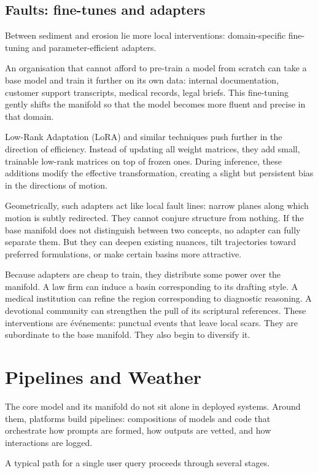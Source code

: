 \documentclass[12pt,a4paper]{article}
\begin{document}
\subsection{Faults: fine-tunes and adapters}

Between sediment and erosion lie more local interventions: domain-specific fine-tuning and parameter-efficient adapters.

An organisation that cannot afford to pre-train a model from scratch can take a base model and train it further on its own data: internal documentation, customer support transcripts, medical records, legal briefs. This fine-tuning gently shifts the manifold so that the model becomes more fluent and precise in that domain.

Low-Rank Adaptation (LoRA) and similar techniques push further in the direction of efficiency. Instead of updating all weight matrices, they add small, trainable low-rank matrices on top of frozen ones. During inference, these additions modify the effective transformation, creating a slight but persistent bias in the directions of motion.

Geometrically, such adapters act like local fault lines: narrow planes along which motion is subtly redirected. They cannot conjure structure from nothing. If the base manifold does not distinguish between two concepts, no adapter can fully separate them. But they can deepen existing nuances, tilt trajectories toward preferred formulations, or make certain basins more attractive.

Because adapters are cheap to train, they distribute some power over the manifold. A law firm can induce a basin corresponding to its drafting style. A medical institution can refine the region corresponding to diagnostic reasoning. A devotional community can strengthen the pull of its scriptural references. These interventions are événements: punctual events that leave local scars. They are subordinate to the base manifold. They also begin to diversify it.

\section{Pipelines and Weather}

The core model and its manifold do not sit alone in deployed systems. Around them, platforms build pipelines: compositions of models and code that orchestrate how prompts are formed, how outputs are vetted, and how interactions are logged.

A typical path for a single user query proceeds through several stages.
\end{document}
